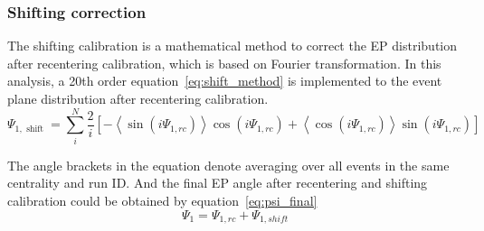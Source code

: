 \subsubsection{Shifting correction}
The shifting calibration is a mathematical method to correct the EP distribution after recentering calibration,
which is based on Fourier transformation.
In this analysis, a 20th order equation~\ref{eq:shift_method} is implemented to the event plane distribution after recentering calibration.
\begin{equation}
\Psi_{1, \text { shift }}=\sum_i^N \frac{2}{i}\left[-\left\langle\sin \left(i \Psi_{1, r c}\right)\right\rangle \cos \left(i \Psi_{1, r c}\right)+\left\langle\cos \left(i \Psi_{1, r c}\right)\right\rangle \sin \left(i \Psi_{1, r c}\right)\right]
\label{eq:shift_method}
\end{equation}

The angle brackets in the equation denote averaging over all events in the same centrality and run ID.
And the final EP angle after recentering and shifting calibration could be obtained by equation~\ref{eq:psi_final}
\begin{equation}
\Psi_1=\Psi_{1, r c}+\Psi_{1, s h i f t}
\label{eq:psi_final}
\end{equation}

